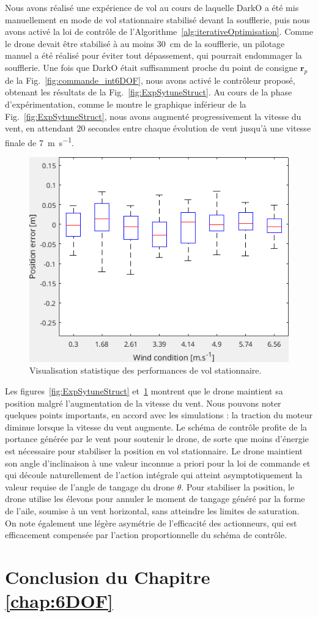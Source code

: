Nous avons réalisé une expérience de vol au cours de laquelle DarkO a été mis manuellement en mode de vol stationnaire stabilisé devant la soufflerie, puis nous avons activé la loi de contrôle de l'Algorithme~\ref{alg:iterativeOptimisation}. Comme le drone devait être stabilisé à au moins \SI{30}{\centi\meter} de la soufflerie, un pilotage manuel a été réalisé pour éviter tout dépassement, qui pourrait endommager la soufflerie. Une fois que DarkO était suffisamment proche du point de consigne $\boldsymbol{r}_{p}$ de la Fig.~\ref{fig:commande_int6DOF}, nous avons activé le contrôleur proposé, obtenant les résultats de la Fig.~\ref{fig:ExpSytuneStruct}. Au cours de la phase d'expérimentation, comme le montre le graphique inférieur de la Fig.~\ref{fig:ExpSytuneStruct}, nous avons augmenté progressivement la vitesse du vent, en attendant 20 secondes entre chaque évolution de vent jusqu'à une vitesse finale de \SI{7}{\meter\per\second}.


\begin{figure}[ht!]
    \centering
    \includegraphics[trim=0cm 0cm 0cm 0cm,clip,width=0.6\columnwidth]{figures/boxplot.png}
    \caption{Visualisation statistique des performances de vol stationnaire.}
    \label{fig:statpos}
\end{figure}

Les figures~\ref{fig:ExpSytuneStruct} et~\ref{fig:statpos} montrent que le drone maintient sa position malgré l'augmentation de la vitesse du vent. Nous pouvons noter quelques points importants, en accord avec les simulations : la traction du moteur diminue lorsque la vitesse du vent augmente. Le schéma de contrôle profite de la portance générée par le vent pour soutenir le drone, de sorte que moins d'énergie est nécessaire pour stabiliser la position en vol stationnaire. Le drone maintient son angle d'inclinaison à une valeur inconnue a priori pour la loi de commande et qui découle naturellement de l'action intégrale qui atteint asymptotiquement la valeur requise de l'angle de tangage du drone $\theta$. Pour stabiliser la position, le drone utilise les élevons pour annuler le moment de tangage généré par la forme de l'aile, soumise à un vent horizontal, sans atteindre les limites de saturation.
On note également une légère asymétrie de l'efficacité des actionneurs, qui est efficacement compensée par l'action proportionnelle du schéma de contrôle.



\section{Conclusion du Chapitre \ref{chap:6DOF}}




